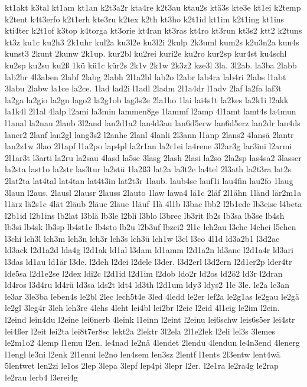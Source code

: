 {kt1akt
k3tal
kt1am
kt1an
k2t3a2r
kta4re
k2t3au
ktau2s
ktä3s
kte3e
kt1ei
k2temp
k2tent
k4t3erfo
k2t1erh
kte3ru
k2tex
k2th
kt3ho
k2t1id
kt1im
k2t1ing
kt1ins
kti4ter
k2t1of
k3top
k4torga
kt3orie
kt4ran
kt3ras
kt4ro
kt3run
kt3s2
ktt2
k2tuns
kt3z
ku1c
ku2h3
2k1uhr
kul2a
ku3l2e
ku3l2i
2kulp
2k3uml
kum2s
k2u3n2a
kun4s
kunst3
2kunt
2kunw
2k1up.
kur2bl
ku2rei
kuri2e
ku2ro
kur2sp
kur4st
ku4schl
ku2sp
ku2su
ku2ß
1kü
kü1c
kür2s
2k1v
2k1w
2k3z2
kze3l
3la.
3l2ab.
la3ba
2labb
lab2br
4l3aben
2labf
2labg
2labh
2l1a2bl
lab2o
l2abr
lab4ra
lab4ri
2labs
l1abt
3labu
2labw
la1ce
la2ce.
1lad
lad2i
l1adl
2ladm
2l1a4dr
l1adv
2laf
la2fa
laf3t
la2ga
la2gio
la2gn
lago2
la2g1ob
lag3s2e
2la1ho
1lai
lai4s1t
la2kes
la2k1i
l2akk
la1k4l
2l1al
4lalp
l2ami
la3min
lammen8ge
1lammf
l2amp
4l1amt
lamt4s
la4mun
l1anal
la2nau
2lanb
3l2and
lan2d1a2
lan4d3au
lan6d5erw
lan6d5erz
lan2dr
lan4ds
laner2
2lanf
lan2gl
lang3s2
l2anhe
2lanl
4lanli
2l3ann
l1anp
2lans2
4lansä
2lantr
lan2z1w
3lao
2l1apf
l1a2po
lap4pl
la2r1an
la2r1ei
la4rene
3l2ar3g
lar3ini
l2armi
2l1ar3t
l3arti
la2ru
la2sau
4lasd
la5se
3lasg
2lash
2lasi
la2so
2la2sp
las4sa2
3lasser
la2sta
last1o
la2str
las3tur
la2stü
1la2ß3
lat2a
la3t2e
la4tel
2l3ath
la2t3ra
lat2s
2lat2ta
lat4tal
lat4tan
lat4t3in
lat2t3r
1laub.
laub4se
lauf1i
lau4fin
lau2fo
1laug
3laun
l2aus.
2lausl
2lausr
2lauss
2lauto
1law
lawa4
lä1c
2läf
2l1ähn
1länd
lär2m1a
l1ärz
lä2s1c
4lät
2läub
2läuc
2läue
1läuf
1là
4l1b
l3bac
lbb2
l2b1ede
lb3eise
l4beta
l2b1id
l2b1ins
lb2lat
l3blä
lb3le
l2bli
l3blo
l3brec
lb3rit
lb2s
lb3sa
lb3se
lb4sh
lb3si
lb4sk
lb3sp
lb4st1e
lb4sto
lb2u
l2b3uf
lbzei2
2l1c
lch2au
l3che
l4chei
l5chen
l3chi
lch3l
lch3m
lch3n
lch3r
lch3s
lch3ü
lch1w
l3cl
l3co
4l1d
ld3a2b1
l3d2ac
ld3ack
l2d1a2d
lda4g
l2d1ak
ld1al
l3dam
ld1amm
l2d1a2n
ld3ane
l2d1a4r
ld3ari
l3das
ld1au
ld1är
l3de.
l2deh
l2dei
l2dele
l3der.
l3d2erl
l3d2ern
l2d1er2p
lder4tr
lde5sa
l2d1e2se
l2dex
ldi2c
l2d1id
l2d1im
l2dob
ldo2r
ld2os
ld2ö2
ld3r
l2dran
ld4ros
l3d4ru
ld4rü
ld3sa
lds2t
ldt4
ld3th
l2d1um
ldy3
ldys2
1le
3le.
le2a
le3an
le3ar
3le3ba
leben4s
le2bl
2lec
lech5t4e
3led
4ledd
le2er
lef2a
le2g1as
le2gau
le2gä
le2gl
3leg4r
3leh
leh3re
4lehs
4leht
lei4bl
lei2br
l2eic
l2eid
4l1eig
le2im
l2ein.
l2eind
lein4du
l2eine
lei6nerb
4leink
l1einn
l2eint
l2einu
lei6schw
leis6s5er
lei4str
lei4ßer
l2eit
lei2ta
lei8t7er8sc
lekt2a
2lektr
3l2ela
2l1e2lek
l2eli
lel3s
3lemes
le2m1o2
4lemp
l1emu
l2en.
le4nad
le2nä
4lendet
2lendu
4lendun
le4n3end
4lenerg
l1engl
le3ni
l2enk
2l1enni
le2no
len4sem
len3sz
2lentf
l1ents
2l3entw
lent4wä
5lentwet
len2zi
le1os
2lep
3lepa
3lepf
lep4pi
3lepr
l2er.
l2e1ra
le2ra4g
le2rap
le2rau
lerb4
l3erei4g
}
